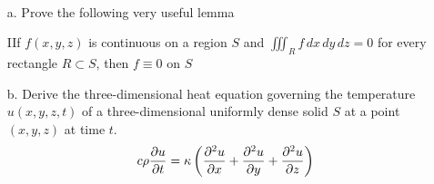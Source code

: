 \documentclass[titlepage]{article}
\begin{document}
\fancyhf{}
\cfoot{\thepage}

\begin{problem}{1}\ \\
\vspace{-2em}
\begin{itemize}
\item[a.] Prove the following very useful lemma
 \vspace{-1em}\begin{lemma}{I}If $f(x,y,z)$ is continuous on a region $S$ and $\iiint_R f\,dx\,dy\,dz = 0$ for every rectangle $R \subset S$, then $f \equiv 0$ on $S$\end{lemma}
\item[b.]Derive the three-dimensional heat equation governing the temperature $u(x,y,z,t)$ of a three-dimensional uniformly dense solid $S$ at a point $(x,y,z)$ at time $t$.
$$c\rho \frac{\partial u}{\partial t} = \kappa \left(\frac{\partial^2 u}{\partial x} + \frac{\partial^2 u}{\partial y} +\frac{\partial^2 u}{\partial z}  \right)$$
\end{itemize}
\end{problem}
\end{document}
